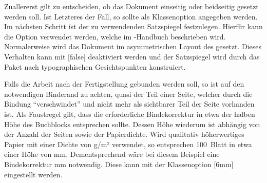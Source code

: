 \documentclass[%
  english,ngerman,%
  geometry=no,DIV=12,automark,%
]{tudscrartcl}
\begin{document}
Zuallererst gilt zu entscheiden, ob das Dokument einseitig oder beidseitig 
gesetzt werden soll. Ist Letzteres der Fall, so sollte  als 
Klassenoption angegeben werden. Im nächsten Schritt ist der zu verwendenden 
Satzspiegel festzulegen. Hierfür kann die Option  verwendet 
werden, welche im \TUDScript-Handbuch beschrieben wird. Normalerweise wird das 
Dokument im asymmetrischen Layout des \CDs gesetzt. Dieses Verhalten kann mit 
[false] deaktiviert werden und der Satzspiegel wird durch das 
Paket  nach typographischen Gesichtspunkten konstruiert.

Falls die Arbeit nach der Fertigstellung gebunden werden soll, so ist auf den 
notwendigen Binderand zu achten, quasi der Teil einer Seite, welcher durch die 
Bindung \enquote{verschwindet} und nicht mehr als sichtbarer Teil der Seite 
vorhanden ist. Als Faustregel gilt, dass die erforderliche Bindekorrektur in 
etwa der halben Höhe des Buchblocks entsprechen sollte. Dessen Höhe wiederum 
ist abhängig von der Anzahl der Seiten sowie der Papierdichte. Wird qualitativ 
höherwertiges Papier mit einer Dichte von \unit[100]{g/m²} verwendet, so 
entsprechen 100~Blatt in etwa einer Höhe von \unit[12]{mm}. Dementsprechend 
wäre bei diesem Beispiel eine Bindekorrektur \unit[6]{mm} notwendig. Diese 
kann mit der Klassenoption [6mm] eingestellt werden.
\end{document}
